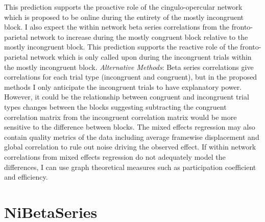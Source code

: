\documentclass[phd,appendix,figures]{uithesis}
\begin{document}
\begin{itemize}
This prediction supports the proactive role of the cingulo-opercular network which is proposed to be online during the entirety of the mostly incongruent block.
I also expect the within network beta series correlations from the fronto-parietal network to increase during the mostly congruent block relative to the mostly incongruent block.
This prediction supports the reactive role of the fronto-parietal network which is only called upon during the incongruent trials within the mostly incongruent block.
\newline
\newline
\textit{Alternative Methods}:
Beta series correlations give correlations for each trial type (incongruent and congruent), but in the proposed methods I only anticipate the incongruent trials to have explanatory power.
However, it could be the relationship between congruent and incongruent trial types changes between the blocks suggesting subtracting the congruent correlation matrix from the incongruent correlation matrix would be more sensitive to the difference between blocks.
The mixed effects regression may also contain quality metrics of the data including average framewise displacement and global correlation to rule out noise driving the observed effect. 
If within network correlations from mixed effects regression do not adequately model the differences, I can use graph theoretical measures such as participation coefficient and efficiency.
\newline

\chapter{NiBetaSeries}


\end{itemize}
\end{document}
